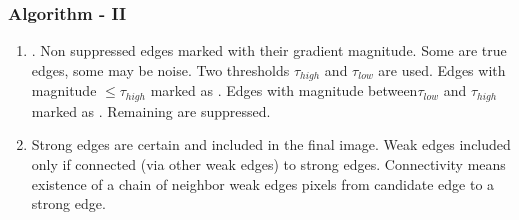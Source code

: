 \documentclass[10pt]{beamer}
\newcommand{\myemph}[1]{{\color{blue}{#1}}}
\begin{document}
\begin{frame}
  \frametitle{Algorithm - II}
  \begin{enumerate}
  \item \myemph{Double thresholding}. Non suppressed edges marked with their gradient magnitude. Some are true edges, some may be noise.
    Two thresholds $\tau_{high}$ and $\tau_{low}$ are used. Edges with magnitude $\leq \tau_{high}$ marked as \myemph{strong edges}.
     Edges with magnitude between$\tau_{low}$ and $\tau_{high}$ marked as \myemph{weak edges}. Remaining are suppressed.\vfill
   \item \myemph{Hysteresis edge tracking} Strong edges are certain
     and included in the final image.  Weak edges included only if
     connected (via other weak edges) to strong edges. Connectivity
     means existence of a chain of neighbor weak edges pixels from
     candidate edge to a strong edge.
  \end{enumerate}
\end{frame}

\end{document}

